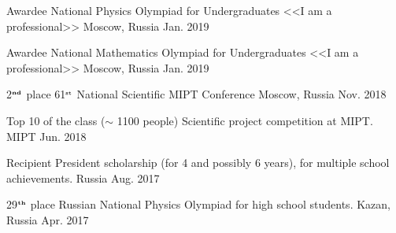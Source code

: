 \begin{cvhonors}
  \cvhonor
    {Awardee} %
    {National Physics Olympiad for Undergraduates <<I am a professional>>} %
    {Moscow, Russia} %
    {Jan. 2019} %
    
    
  \cvhonor
    {Awardee} %
    {National Mathematics Olympiad for Undergraduates <<I am a professional>>} %
    {Moscow, Russia} %
    {Jan. 2019} %
    
  \cvhonor
    {2$^{\textbf{\tiny nd}}$ place} %
    {61$^{\texttt{\tiny st}}$ National Scientific MIPT Conference} %
    {Moscow, Russia} %
    {Nov. 2018} %
    
  \cvhonor
    {Top 10 of the class ($\sim$ 1100 people)} %
    {Scientific project competition at MIPT.} %
    {MIPT} %
    {Jun. 2018} %
    
  \cvhonor
    {Recipient} %
    {President scholarship (for 4 and possibly 6 years), for multiple school achievements.} %
    {Russia} %
    {Aug. 2017} %

  \cvhonor
    {29$^{\textbf{\tiny th}}$ place} %
    {Russian National Physics Olympiad for high school students.} %
    {Kazan, Russia} %
    {Apr. 2017} %
	
\end{cvhonors}
